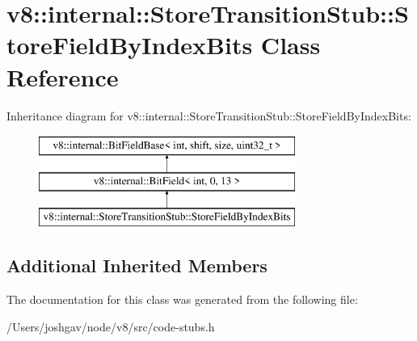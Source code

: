 \hypertarget{classv8_1_1internal_1_1_store_transition_stub_1_1_store_field_by_index_bits}{}\section{v8\+:\+:internal\+:\+:Store\+Transition\+Stub\+:\+:Store\+Field\+By\+Index\+Bits Class Reference}
\label{classv8_1_1internal_1_1_store_transition_stub_1_1_store_field_by_index_bits}
Inheritance diagram for v8\+:\+:internal\+:\+:Store\+Transition\+Stub\+:\+:Store\+Field\+By\+Index\+Bits\+:\begin{figure}[H]
\begin{center}
\leavevmode
\includegraphics[height=3.000000cm]{classv8_1_1internal_1_1_store_transition_stub_1_1_store_field_by_index_bits}
\end{center}
\end{figure}
\subsection*{Additional Inherited Members}


The documentation for this class was generated from the following file\+:\begin{DoxyCompactItemize}
\item 
/\+Users/joshgav/node/v8/src/code-\/stubs.\+h\end{DoxyCompactItemize}
